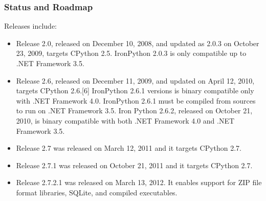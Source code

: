 \documentclass[12pt,a4paper,final,twoside,titlepage]{book}
\begin{document}
\subsubsection{Status and Roadmap}
Releases include:
\begin{itemize}
\item Release 2.0, released on December 10, 2008, and updated as 2.0.3 on October 23, 2009, targets CPython 2.5. IronPython 2.0.3 is only compatible up to .NET Framework 3.5.
\item Release 2.6, released on December 11, 2009, and updated on April 12, 2010, targets CPython 2.6.[6] IronPython 2.6.1 versions is binary compatible only with .NET Framework 4.0. IronPython 2.6.1 must be compiled from sources to run on .NET Framework 3.5. Iron Python 2.6.2, released on October 21, 2010, is binary compatible with both .NET Framework 4.0 and .NET Framework 3.5.
\item Release 2.7 was released on March 12, 2011 and it targets CPython 2.7.
\item Release 2.7.1 was released on October 21, 2011 and it targets CPython 2.7.
\item Release 2.7.2.1 was released on March 13, 2012. It enables support for ZIP file format libraries, SQLite, and compiled executables.
\end{itemize}
\end{document}
